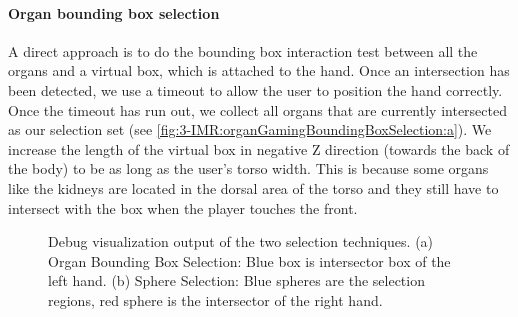 \paragraph{Organ bounding box selection}
A direct approach is to do the bounding box interaction test between all the organs and a virtual box, which is attached to the hand. 
Once an intersection has been detected, we use a timeout to allow the user to position the hand correctly. Once the timeout has run out, we collect all organs that are currently intersected as our selection set (see \figurename{\ref{fig:3-IMR:organGamingBoundingBoxSelection:a}}).
We increase the length of the virtual box in negative Z direction (towards the back of the body) to be as long as the user's torso width. This is because some organs like the kidneys are located in the dorsal area of the torso and they still have to intersect with the box when the player touches the front.

\begin{figure}[htb]
	\centering
	\caption{Debug visualization output of the two selection techniques. (a) Organ Bounding Box Selection: Blue box is intersector box of the left hand. (b) Sphere Selection: Blue spheres are the selection regions, red sphere is the intersector of the right hand.}
	\label{fig:3-IMR:organGamingBoundingBoxSelection}
\end{figure}
